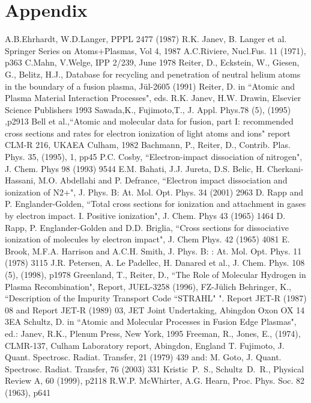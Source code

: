 \documentclass[12pt,dvipdfmx]{article}
\begin{document}
\section{Appendix}
\newpage
\begin{thebibliography}{99}
  A.B.Ehrhardt, W.D.Langer, PPPL 2477 (1987)
 R.K. Janev, B. Langer et al.  Springer Series on Atoms+Plasmas,
                   Vol 4, 1987
 A.C.Riviere, Nucl.Fus. 11 (1971), p363
 C.Mahn, V.Welge, IPP 2/239, June 1978
 Reiter, D., Eckstein, W., Giesen, G., Belitz,
                    H.J.,
                    Database for recycling and penetration of neutral
                    helium atoms in the boundary of a fusion plasma,
                    J\"ul-2605 (1991)
  Reiter, D. in ``Atomic and Plasma Material Interaction Processes", eds. R.K. Janev, H.W. Drawin, Elsevier Science Publishers 1993
 Sawada,K.,  Fujimoto,T., J. Appl. Phys.78 (5), (1995)
                    ,p2913
  Bell et al.,``Atomic and molecular data for fusion, part I:
recommended cross sections and rates for electron ionization of light atoms and ions"
 report CLM-R 216, UKAEA Culham, 1982
  Bachmann, P., Reiter, D., Contrib. Plas. Phys.
                       35, (1995), 1, pp45
  P.C. Cosby, ``Electron-impact dissociation of nitrogen", J. Chem. Phys 98 (1993) 9544
 E.M. Bahati, J.J. Jureta, D.S. Belic, H. Cherkani-Hassani, M.O. Abdellahi and P. Defrance, ``Electron impact dissociation and ionization of N2+",
J. Phys. B: At. Mol. Opt. Phys. 34 (2001) 2963
 D. Rapp and P. Englander-Golden, ``Total cross sections for ionization and attachment in gases by electron impact. I. Positive ionization", J. Chem. Phys 43 (1965) 1464
 D. Rapp, P. Englander-Golden and D.D. Briglia, ``Cross sections for dissociative ionization of molecules by electron impact", J. Chem Phys. 42 (1965) 4081
 E. Brook, M.F.A. Harrison and A.C.H. Smith, J. Phys. B: : At. Mol. Opt. Phys. 11 (1978) 3115
 J.R. Petersen, A. Le Padellec, H. Danared et al., J. Chem. Phys. 108 (5), (1998), p1978
 Greenland, T., Reiter, D.,
                   ``The Role of Molecular Hydrogen in Plasma
                    Recombination", Report, JUEL-3258 (1996), FZ-J\"ulich
 Behringer, K.,
``Description of the Impurity Transport Code ``STRAHL" ".
Report JET-R (1987) 08 and
Report JET-R (1989) 03, JET Joint Undertaking, Abingdon Oxon OX 14 3EA
 Schultz, D. in ``Atomic and Molecular Processes in Fusion
                     Edge Plasmas", ed.: Janev, R.K., Plenum Press, New York, 1995
 Freeman, R., Jones, E., (1974), CLMR-137, Culham Laboratory report, Abingdon, England
 T.  Fujimoto, J. Quant. Spectrosc. Radiat. Transfer, 21 (1979) 439 and:
M. Goto, J. Quant. Spectrosc. Radiat. Transfer, 76 (2003) 331
 Kristic~P.~S., Schultz~D.~R., Physical Review A, 60 (1999), p2118
 R.W.P. McWhirter, A.G. Hearn, Proc. Phys. Soc. 82 (1963), p641
 \end{thebibliography}
\end{document}
